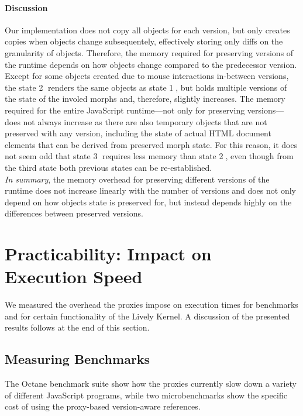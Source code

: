 \paragraph{Discussion}
Our implementation does not copy all objects for each version, but only creates copies when objects change subsequentely, effectively storing only diffs on the granularity of objects.
Therefore, the memory required for preserving versions of the runtime depends on how objects change compared to the predecessor version.
Except for some objects created due to mouse interactions in-between versions, the state \textcircled{2} renders the same objects as state \textcircled{1}, but holds multiple versions of the state of the involed morphs and, therefore, slightly increases.
The memory required for the entire JavaScript runtime---not only for preserving versions---does not always increase as there are also temporary objects that are not preserved with any version, including the state of actual HTML document elements that can be derived from preserved morph state.
For this reason, it does not seem odd that state \textcircled{3} requires less memory than state \textcircled{2}, even though from the third state both previous states can be re-established.\\
\emph{In summary}, the memory overhead for preserving different versions of the runtime does not increase linearly with the number of versions and does not only depend on how objects state is preserved for, but instead depends highly on the differences between preserved versions.



\section{Practicability: Impact on Execution Speed} \label{sec:DISCUSSION:3}

We measured the overhead the proxies impose on execution times for benchmarks and for certain functionality of the Lively Kernel.
A discussion of the presented results follows at the end of this section.


\subsection{Measuring Benchmarks}

The Octane benchmark suite show how the proxies currently slow down a variety of different JavaScript programs, while two microbenchmarks show the specific cost of using the proxy-based version-aware references.

